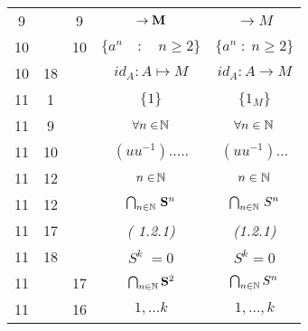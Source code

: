 \documentclass[a4paper,11pt]{article}
\begin{document}
\begin{center}
\begin{tabular}{|c|c|c|c|c|}
    9  & &  9 & $\to \textrm{\textbf{M}}$ & $\to M$ \\
    10 & & 10 & $\{ a^{ n } \quad : \quad n \geq 2 \}$ & $\{ a^{ n } \; : \; n \geq 2 \}$ \\
    10 & 18 & & $id_{ A } : A \mapsto M$ & $id_{ A } : A \to M$ \\
    11 &  1 & & $\{ 1 \}$ & $\{ 1_{ M } \}$ \\
    11 &  9 & & $\forall n \in \! \mathbb{N}$ & $\forall n \in \mathbb{N}$ \\
    11 & 10 & & $( u u^{ -1 } ).....$ & $( u u^{ - 1 } ) \ldots$ \\
    11 & 12 & & $n \in \! \mathbb{N}$ & $n \in \mathbb{N}$ \\
    11 & 12 & & $\bigcap_{ n \in \mathbb{N} } \, \mathbf{S}^{ n }$
           & $\bigcap_{ n \in \mathbb{N} } \, S^{ n }$ \\
    11 & 17 & & \textit{( 1.2.1)} & \textit{(1.2.1)} \\
    11 & 18 & & $S^{ k } \; = 0$ & $S^{ k } = 0$ \\
    11 & & 17 & $\bigcap_{ n \in \mathbb{N} } \mathbf{S}^{ 2 }$ & $\bigcap_{ n \in \mathbb{N} } S^{ n }$ \\
    11 & & 16 & $1, ...k$ & $1, \ldots, k$ \\
    \hline
  \end{tabular}

\end{center}
\end{document}
